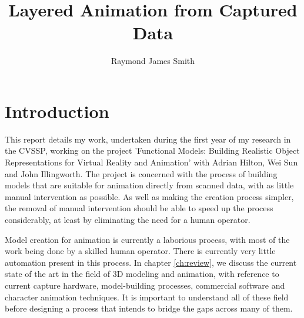 \documentclass[10pt,oneside,fleqn,a4paper]{book}
\begin{document}

\title{Layered Animation from Captured Data}
\author{Raymond James Smith}

\renewcommand{\month}{9}
\renewcommand{\year}{1999}


\makefront

\tableofcontents

\listoffigures

\chapter{\label{ch:intro}Introduction}
\pagestyle{headings}
This report details my work, undertaken during the first year of my research in the CVSSP, working on the project 'Functional Models: Building Realistic Object Representations for Virtual Reality and Animation' with Adrian Hilton, Wei Sun and John Illingworth. The project is concerned with the process of building models that are suitable for animation directly from scanned data, with as little manual intervention as possible. As well as making the creation process simpler, the removal of manual intervention should be able to speed up the process considerably, at least by eliminating the need for a human operator.

Model creation for animation is currently a laborious process, with most of the work being done by a skilled human operator. There is currently very little automation present in this process. In chapter \ref{ch:review}, we discuss the current state of the art in the field of 3D modeling and animation, with reference to current capture hardware, model-building processes, commercial software and character animation techniques. It is important to understand all of these field before designing a process that intends to bridge the gaps across many of them.
\end{document}
